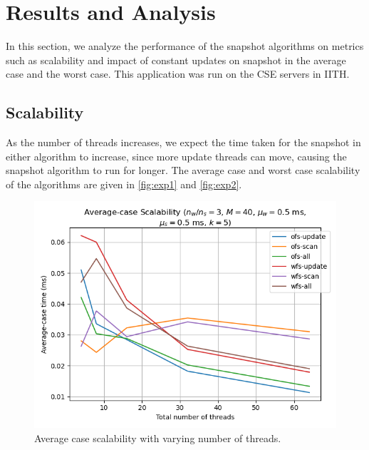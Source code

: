 \documentclass[conference,compsoc]{IEEEtran}
\begin{document}
\section{Results and Analysis}
\label{sec:results}

In this section, we analyze the performance of the snapshot algorithms on
metrics such as scalability and impact of constant updates on snapshot in the
average case and the worst case. This application was run on the CSE servers in
IITH.

\subsection{Scalability}
\label{subsec:scalability}

As the number of threads increases, we expect the time taken for the snapshot in
either algorithm to increase, since more update threads can move, causing the
snapshot algorithm to run for longer. The average case and worst case
scalability of the algorithms are given in \autoref{fig:exp1} and
\autoref{fig:exp2}.

\begin{figure}[!ht]
    \centering
    \includegraphics[width=\columnwidth]{images/exp1.png} 
    \caption{Average case scalability with varying number of threads.}
    \label{fig:exp1}
\end{figure}
\end{document}
